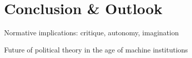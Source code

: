 \chapter{Conclusion \& Outlook}
Normative implications: critique, autonomy, imagination

Future of political theory in the age of machine institutions

